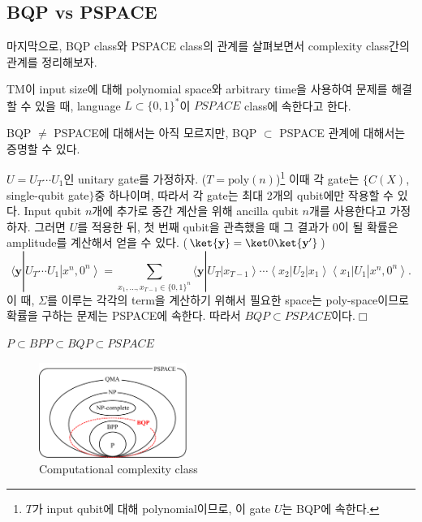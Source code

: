 \subsection{BQP vs PSPACE}
마지막으로, BQP class와 PSPACE class의 관계를 살펴보면서 complexity class간의 관계를 정리해보자.
\begin{definition}\label{def:PSPACE}
    TM이 input size에 대해 polynomial space와 arbitrary time을 사용하여 문제를 해결할 수 있을 때, language $L \subset \{0, 1\}^*$이 $PSPACE$ class에 속한다고 한다.
\end{definition}
BQP $\ne$ PSPACE에 대해서는 아직 모르지만, BQP $\subset$ PSPACE 관계에 대해서는 증명할 수 있다.

$U= U_T \cdots U_1$인 unitary gate를 가정하자. ($T = \text{poly}(n)$)\footnote{$T$가 input qubit에 대해 polynomial이므로, 이 gate $U$는 BQP에 속한다.} 이때 각 gate는 $\{C(X)$, single-qubit gate$\}$중 하나이며, 따라서 각 gate는 최대 2개의 qubit에만 작용할 수 있다.
Input qubit $n$개에 추가로 중간 계산을 위해 ancilla qubit $n$개를 사용한다고 가정하자. 그러면 $U$를 적용한 뒤, 첫 번째 qubit을 관측했을 때 그 결과가 0이 될 확률은 amplitude를 계산해서 얻을 수 있다. ($\ket{\mathbf y} = \ket 0 \ket{\mathbf y'}$)
\begin{equation*}
    \langle\boldsymbol{y}| U_T \cdots U_1\left|x^n, 0^n\right\rangle=\sum_{x_1, \ldots, x_{T-1} \in\{0,1\}^n}\langle\boldsymbol{y}| U_T\left|x_{T-1}\right\rangle \cdots\left\langle x_2\right| U_2\left|x_1\right\rangle\left\langle x_1\right| U_1\left|x^n, 0^n\right\rangle .
\end{equation*}
이 때, $\Sigma$를 이루는 각각의 term을 계산하기 위해서 필요한 space는 poly-space이므로 확률을 구하는 문제는 PSPACE에 속한다. 따라서 $BQP \subset PSPACE$이다.$\Box$
\begin{note}[Summary] $P \subset BPP \subset BQP \subset PSPACE$
\end{note}
\begin{figure}[h]
    \centering
    \includegraphics[width=0.43\textwidth]{figures/class.pdf}
    \caption{Computational complexity class}
    \label{fig:BQP-PSPACE}
\end{figure}